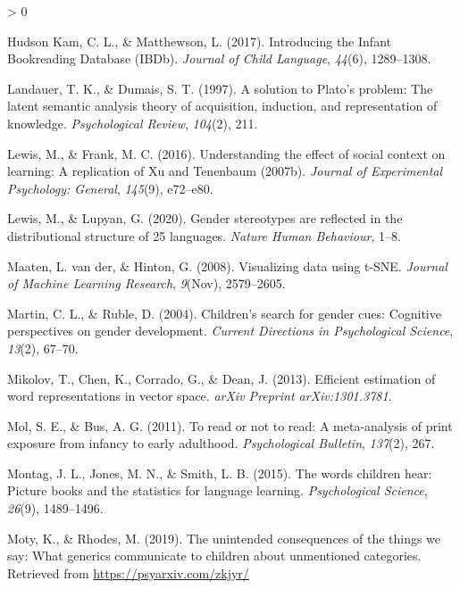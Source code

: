 \documentclass[
  english,
  ,man,floatsintext]{apa6}
\newlength{\cslhangindent}
\newenvironment{CSLReferences}[2] %
 {%
  \setlength{\parindent}{0pt}
  \ifodd #1 \everypar{\setlength{\hangindent}{\cslhangindent}}\ignorespaces\fi
  \ifnum #2 > 0
  \setlength{\parskip}{#2\baselineskip}
  \fi
 }%
 {}
\begin{document}
\begin{CSLReferences}{1}{0}
\leavevmode\hypertarget{ref-kam_2017}{}%
Hudson Kam, C. L., \& Matthewson, L. (2017). Introducing the {I}nfant {B}ookreading {D}atabase ({IBDb}). \emph{Journal of Child Language}, \emph{44}(6), 1289--1308.

\leavevmode\hypertarget{ref-landauer1997solution}{}%
Landauer, T. K., \& Dumais, S. T. (1997). A solution to {P}lato's problem: The latent semantic analysis theory of acquisition, induction, and representation of knowledge. \emph{Psychological Review}, \emph{104}(2), 211.

\leavevmode\hypertarget{ref-lewis2016understanding}{}%
Lewis, M., \& Frank, M. C. (2016). Understanding the effect of social context on learning: A replication of {X}u and {T}enenbaum (2007b). \emph{Journal of Experimental Psychology: General}, \emph{145}(9), e72--e80.

\leavevmode\hypertarget{ref-lewis2020}{}%
Lewis, M., \& Lupyan, G. (2020). Gender stereotypes are reflected in the distributional structure of 25 languages. \emph{Nature Human Behaviour}, 1--8.

\leavevmode\hypertarget{ref-maaten2008visualizing}{}%
Maaten, L. van der, \& Hinton, G. (2008). Visualizing data using t-SNE. \emph{Journal of Machine Learning Research}, \emph{9}(Nov), 2579--2605.

\leavevmode\hypertarget{ref-martin2004children}{}%
Martin, C. L., \& Ruble, D. (2004). Children's search for gender cues: Cognitive perspectives on gender development. \emph{Current Directions in Psychological Science}, \emph{13}(2), 67--70.

\leavevmode\hypertarget{ref-mikolov2013efficient}{}%
Mikolov, T., Chen, K., Corrado, G., \& Dean, J. (2013). Efficient estimation of word representations in vector space. \emph{arXiv Preprint arXiv:1301.3781}.

\leavevmode\hypertarget{ref-mol2011read}{}%
Mol, S. E., \& Bus, A. G. (2011). To read or not to read: A meta-analysis of print exposure from infancy to early adulthood. \emph{Psychological Bulletin}, \emph{137}(2), 267.

\leavevmode\hypertarget{ref-montag2015words}{}%
Montag, J. L., Jones, M. N., \& Smith, L. B. (2015). The words children hear: Picture books and the statistics for language learning. \emph{Psychological Science}, \emph{26}(9), 1489--1496.

\leavevmode\hypertarget{ref-moty2019unintended}{}%
Moty, K., \& Rhodes, M. (2019). The unintended consequences of the things we say: What generics communicate to children about unmentioned categories. Retrieved from \url{https://psyarxiv.com/zkjyr/}


\end{CSLReferences}
\end{document}
